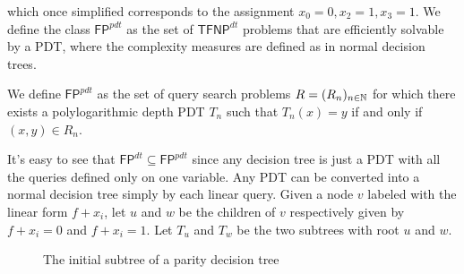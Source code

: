 which once simplified corresponds to the assignment $x_0 = 0, x_2 = 1, x_3 = 1$. We define the class $\mathsf{FP}^{pdt}$ as the set of $\mathsf{TFNP}^{dt}$ problems that are efficiently solvable by a PDT, where the complexity measures are defined as in normal decision trees.

\begin{definition}
 We define $\mathsf{FP}^{pdt}$ as the set of query search problems $R = (R_n)_{n \in \mathbb{N}}$ for which there exists a polylogarithmic depth PDT $T_n$ such that $T_n(x) = y$ if and only if $(x,y) \in R_n$.
\end{definition}

It's easy to see that $\mathsf{FP}^{dt} \subseteq \mathsf{FP}^{pdt}$ since any decision tree is just a PDT with all the queries defined only on one variable. Any PDT can be converted into a normal decision tree simply by  each linear query. Given a node $v$ labeled with the linear form $f + x_i$, let $u$ and $w$ be the children of $v$ respectively given by $f + x_i = 0$ and $f+x_i = 1$. Let $T_u$ and $T_w$ be the two subtrees with root $u$ and $w$.

\newpage

\begin{figure}[H]
    \centering


    \caption{The initial subtree of a parity decision tree}
\end{figure}

